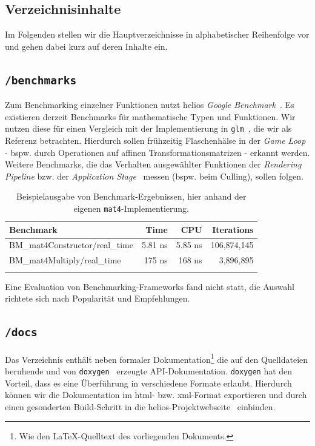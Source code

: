 \subsection{Verzeichnisinhalte}

Im Folgenden stellen wir die Hauptverzeichnisse in alphabetischer Reihenfolge vor und gehen dabei kurz auf deren Inhalte ein.


\subsection*{\texttt{/benchmarks}}
Zum Benchmarking einzelner Funktionen nutzt helios \textit{Google Benchmark}~\cite[]{googlebenchmarkgithub}.
Es existieren derzeit Benchmarks für mathematische Typen und Funktionen.
Wir nutzen diese für einen Vergleich mit der Implementierung in \texttt{glm}~\cite[]{glmGithub}, die wir als Referenz betrachten.
Hierdurch sollen frühzeitig Flaschenhälse in der \textit{Game Loop} - bspw. durch Operationen auf affinen Transformationsmatrizen - erkannt werden.
Weitere Benchmarks, die das Verhalten ausgewählter Funktionen der \textit{Rendering Pipeline} bzw. der \textit{Application Stage}~\cite[687]{Gre19} messen (bspw. beim Culling), sollen folgen.




\setlength{\tabcolsep}{8pt}
\begin{table}[t]
    \centering
    {\renewcommand{\arraystretch}{1.2}%
    \begin{tabular}{lrrr}
        \hline
        \textbf{Benchmark} & \textbf{Time} & \textbf{CPU} & \textbf{Iterations} \\
        \hline
        BM\_mat4Constructor/real\_time         & 5.81 ns  & 5.85 ns  & 106{,}874{,}145 \\
        BM\_mat4Multiply/real\_time            & 175 ns   & 168 ns   & 3{,}896{,}895 \\
        \hline\\
    \end{tabular}}
    \caption{Beispielausgabe von Benchmark-Ergebnissen, hier anhand der eigenen \texttt{mat4}-Implementierung.}
    \label{tab:mat4-benchmark}
\end{table}


Eine Evaluation von Benchmarking-Frameworks fand nicht statt, die Auswahl richtete sich nach Popularität und Empfehlungen.

\subsection*{\texttt{/docs}}
Das Verzeichnis enthält neben formaler Dokumentation\footnote{Wie den \LaTeX-Quelltext des vorliegenden Dokuments.} die auf den Quelldateien beruhende und von \texttt{doxygen}~\cite[]{Doxygen} erzeugte API-Dokumentation.
\texttt{doxygen} hat den Vorteil, dass es eine Überführung in verschiedene Formate erlaubt.
Hierdurch können wir die Dokumentation im html- bzw. xml-Format exportieren und durch einen gesonderten Build-Schritt in die helios-Projektwebseite~\cite[]{helios} einbinden.\par


